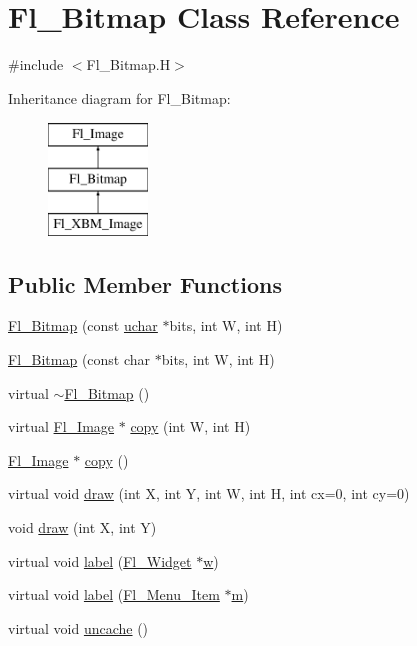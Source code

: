 \hypertarget{class_fl___bitmap}{}\section{Fl\+\_\+\+Bitmap Class Reference}
\label{class_fl___bitmap}


{\ttfamily \#include $<$Fl\+\_\+\+Bitmap.\+H$>$}

Inheritance diagram for Fl\+\_\+\+Bitmap\+:\begin{figure}[H]
\begin{center}
\leavevmode
\includegraphics[height=3.000000cm]{class_fl___bitmap}
\end{center}
\end{figure}
\subsection*{Public Member Functions}
\begin{DoxyCompactItemize}
\item 
\hyperlink{class_fl___bitmap_abb9d089d289d990de49b9722fbd57241}{Fl\+\_\+\+Bitmap} (const \hyperlink{fl__types_8h_a65f85814a8290f9797005d3b28e7e5fc}{uchar} $\ast$bits, int W, int H)
\item 
\hyperlink{class_fl___bitmap_a5eb102e0ab090a7c547e9349dbe7e943}{Fl\+\_\+\+Bitmap} (const char $\ast$bits, int W, int H)
\item 
virtual \hyperlink{class_fl___bitmap_ae94d70a06db6f307388a140ec621606d}{$\sim$\+Fl\+\_\+\+Bitmap} ()
\item 
virtual \hyperlink{class_fl___image}{Fl\+\_\+\+Image} $\ast$ \hyperlink{class_fl___bitmap_af8d08b1153115fc223215251878c8005}{copy} (int W, int H)
\item 
\hyperlink{class_fl___image}{Fl\+\_\+\+Image} $\ast$ \hyperlink{class_fl___bitmap_a50bad9f31e02c3c71c90622ca1f234bf}{copy} ()
\item 
virtual void \hyperlink{class_fl___bitmap_abd03a34e84704ae410bd366626c0a6ef}{draw} (int X, int Y, int W, int H, int cx=0, int cy=0)
\item 
void \hyperlink{class_fl___bitmap_adbc4fad3bd0f24231c1b056d197a8172}{draw} (int X, int Y)
\item 
virtual void \hyperlink{class_fl___bitmap_af17e00fe7cc3909a0ad8910dc71aee5f}{label} (\hyperlink{class_fl___widget}{Fl\+\_\+\+Widget} $\ast$\hyperlink{class_fl___image_ac99df85a5ccd161b2b39042231aa2985}{w})
\item 
virtual void \hyperlink{class_fl___bitmap_a8d35f1528e46fc3447618d5534e7e428}{label} (\hyperlink{struct_fl___menu___item}{Fl\+\_\+\+Menu\+\_\+\+Item} $\ast$\hyperlink{forms_8_h_a2ccd5640c2b2869841c5dab22b937079}{m})
\item 
virtual void \hyperlink{class_fl___bitmap_afd50086093bdbf6c0de1c20ec1ecd4b5}{uncache} ()
\end{DoxyCompactItemize}
